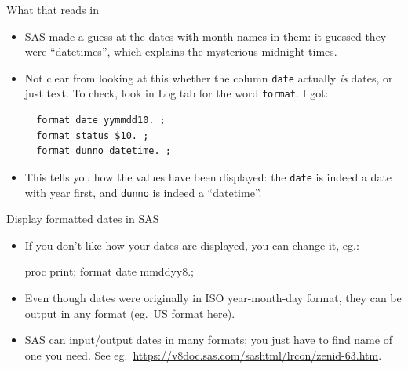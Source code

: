 \documentclass[unknownkeysallowed]{beamer}\usepackage[]{graphicx}\usepackage[]{color}
\begin{document}
\begin{frame}[fragile]{What that reads in}
  
    
    
    \begin{itemize}
      
    \item SAS made a guess at the dates with month names in them: it
      guessed they were ``datetimes'', which explains the mysterious
      midnight times.
    \item Not clear from looking at this whether the column
      \texttt{date} actually \emph{is} dates, or just text. To check,
      look in Log tab for the word \texttt{format}. I got:
  
      \begin{small}
\begin{verbatim}
  format date yymmdd10. ;
  format status $10. ;
  format dunno datetime. ;
\end{verbatim}
        
      \end{small}
      
      
    \item This tells you how the values have been displayed: the
      \texttt{date} is indeed a date with year first, and
      \texttt{dunno} is indeed a ``datetime''.

\end{itemize}
  
\end{frame}

\begin{frame}[fragile]{Display formatted dates in SAS}

  \begin{itemize}
  \item If you don't like how your dates are displayed, you can change
   it, eg.:  
  
  \begin{Sascode}[store=db]
proc print;
  format date mmddyy8.;
  \end{Sascode}
  
  
  \item   Even though dates were originally in ISO year-month-day format, they
  can be output in any format (eg.\ US format here).
\item SAS can input/output dates in many formats; you just have to
  find name of one you need. See eg.\ \url{https://v8doc.sas.com/sashtml/lrcon/zenid-63.htm}.
  \end{itemize}
  
\end{frame}
\end{document}
